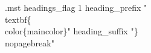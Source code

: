 \begin{filecontents*}{\jobname.mst}
headings_flag 1
heading_prefix "\\textbf\{\\color\{maincolor\}"
heading_suffix "\}\\nopagebreak\n"
\end{filecontents*}